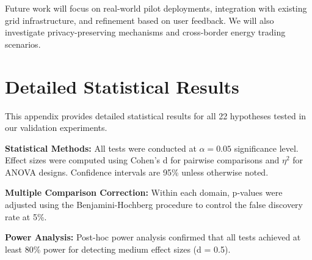 \documentclass[conference]{IEEEtran}
\begin{document}
Future work will focus on real-world pilot deployments, integration with
existing grid infrastructure, and refinement based on user feedback. We will
also investigate privacy-preserving mechanisms and cross-border energy trading
scenarios.


% 

\appendix
\section{Detailed Statistical Results}\label{sec:appendix_stats}

This appendix provides detailed statistical results for all 22
hypotheses tested in our validation experiments.

\textbf{Statistical Methods:} All tests were conducted at $\alpha = 0.05$
significance level. Effect sizes were computed using Cohen's d for pairwise
comparisons and $\eta^2$ for ANOVA designs. Confidence intervals are 95\%
unless otherwise noted.

\textbf{Multiple Comparison Correction:} Within each domain, p-values were
adjusted using the Benjamini-Hochberg procedure to control the false discovery
rate at 5\%.

\textbf{Power Analysis:} Post-hoc power analysis confirmed that all tests
achieved at least 80\% power for detecting medium effect sizes (d = 0.5).
\end{document}
